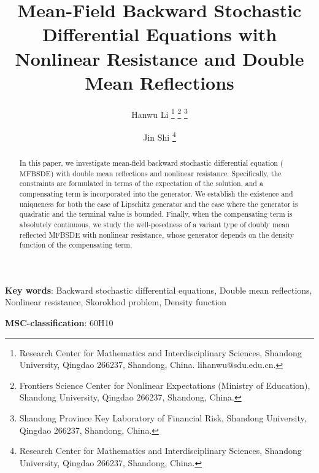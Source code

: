 \documentclass[10pt]{article}%
\numberwithin{equation}{section}
\begin{document}
	\title{Mean-Field Backward Stochastic Differential Equations with Nonlinear Resistance and Double Mean Reflections}
	\author{ 	Hanwu Li \thanks{Research Center for Mathematics and Interdisciplinary Sciences, Shandong University, Qingdao 266237, Shandong, China. lihanwu@sdu.edu.cn.}
	\thanks{Frontiers Science Center for Nonlinear Expectations (Ministry of Education), Shandong University, Qingdao 266237, Shandong, China.}
    \thanks{Shandong Province Key Laboratory of Financial Risk, Shandong University, Qingdao 266237, Shandong, China.}
    \and Jin Shi \thanks{Research Center for Mathematics and Interdisciplinary Sciences, Shandong University, Qingdao 266237, Shandong, China. }}
	\date{}
	\maketitle
	
	\begin{abstract}
      In this paper, we investigate mean-field backward stochastic differential equation ($\text{MFBSDE}$) with double mean reflections and nonlinear resistance. Specifically, the constraints are formulated in terms of the expectation of the solution, and a compensating term is incorporated into the generator.  We establish the existence and uniqueness for both the case of Lipschitz generator and the case where the generator is quadratic and the terminal value is bounded. Finally, when the compensating term is absolutely continuous, we study the well-posedness of a variant type of doubly mean reflected MFBSDE with nonlinear resistance, whose generator depends on the density function of the compensating term.
	\end{abstract}

    \textbf{Key words}: Backward stochastic differential equations, Double mean reflections, Nonlinear resistance, Skorokhod problem, Density function

    \textbf{MSC-classification}: 60H10
	
\end{document}
